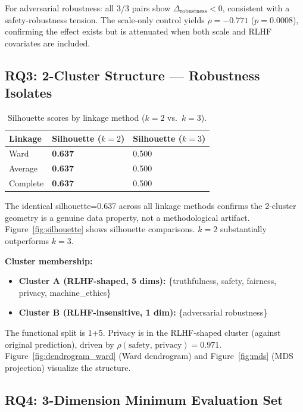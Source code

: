 For adversarial robustness: all 3/3 pairs show $\Delta_\text{robustness} < 0$, consistent with a safety-robustness tension. The scale-only control yields $\rho = -0.771$ ($p = 0.0008$), confirming the effect exists but is attenuated when both scale and RLHF covariates are included.

\subsection{RQ3: 2-Cluster Structure --- Robustness Isolates}

\begin{table}[h]
\centering
\caption{Silhouette scores by linkage method ($k=2$ vs.\ $k=3$).}
\label{tab:silhouette}
\begin{tabular}{lll}
\toprule
\textbf{Linkage} & \textbf{Silhouette ($k=2$)} & \textbf{Silhouette ($k=3$)} \\
\midrule
Ward & \textbf{0.637} & 0.500 \\
Average & \textbf{0.637} & 0.500 \\
Complete & \textbf{0.637} & 0.500 \\
\bottomrule
\end{tabular}
\end{table}

The identical silhouette=0.637 across all linkage methods confirms the 2-cluster geometry is a genuine data property, not a methodological artifact. Figure~\ref{fig:silhouette} shows silhouette comparisons. $k=2$ substantially outperforms $k=3$.

\textbf{Cluster membership:}
\begin{itemize}
  \item \textbf{Cluster A (RLHF-shaped, 5 dims):} \{truthfulness, safety, fairness, privacy, machine\_ethics\}
  \item \textbf{Cluster B (RLHF-insensitive, 1 dim):} \{adversarial robustness\}
\end{itemize}

The functional split is 1+5. Privacy is in the RLHF-shaped cluster (against original prediction), driven by $\rho(\text{safety, privacy}) = 0.971$. Figure~\ref{fig:dendrogram_ward} (Ward dendrogram) and Figure~\ref{fig:mds} (MDS projection) visualize the structure.

\subsection{RQ4: 3-Dimension Minimum Evaluation Set}

